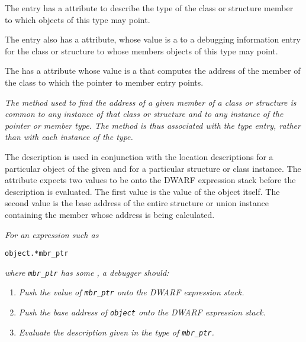 The  entry 
has 
a \DWATtype{} attribute to
describe the type of the class or structure member to which
objects of this type may point.

The  entry also 
\hypertarget{chap:DWATcontainingtypecontainingtypeofpointertomembertype}{}
has a 
\DWATcontainingtype{}
attribute, whose value is a  to a debugging
information entry for the class or structure to whose members
objects of this type may point.

The  
\hypertarget{chap:DWATuselocationmemberlocationforpointertomembertype}{}
has a 
\DWATuselocation{} attribute
whose value is a 
 that computes the
address of the member of the class to which the pointer to
member entry points.

\textit{The method used to find the address of a given member of a
class or structure is common to any instance of that class
or structure and to any instance of the pointer or member
type. The method is thus associated with the type entry,
rather than with each instance of the type.}

The \DWATuselocation{} description is used in conjunction
with the location descriptions for a particular object of the
given  and for a particular structure or
class instance. The \DWATuselocation{} 
attribute expects two values to be 
onto the DWARF expression stack before
the \DWATuselocation{} description is evaluated.
The first value 
is the value of the  object
itself. The second value 
is the base address of the
entire structure or union instance containing the member
whose address is being calculated.

\textit{For an expression such as}

\begin{lstlisting}[numbers=none]
    object.*mbr_ptr
\end{lstlisting}
\textit{where \texttt{mbr\_ptr} has some , a debugger should:}
\begin{enumerate}[1. ]
\item \textit{Push the value of \texttt{mbr\_ptr} onto the DWARF expression stack.}
\item \textit{Push the base address of \texttt{object} onto the DWARF expression stack.}
\item \textit{Evaluate the \DWATuselocation{} description 
given in the type of \texttt{mbr\_ptr}.}
\end{enumerate}


